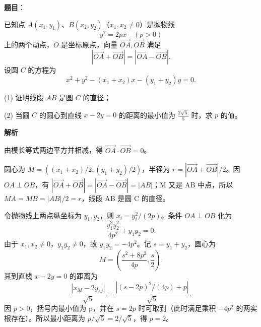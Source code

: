 \begin{answer}

\textbf{题目}：

已知点 \(A(x_1,y_1)\)、\(B(x_2,y_2)\)（\(x_1,x_2\ne0\)）是抛物线
\nopagebreak[4]
\[
y^2=2px\quad(p>0)
\]
上的两个动点，\(O\) 是坐标原点，向量 \(\overrightarrow{OA},\overrightarrow{OB}\) 满足
\nopagebreak[4]
\[
\left|\overrightarrow{OA}+\overrightarrow{OB}\right|=
\left|\overrightarrow{OA}-\overrightarrow{OB}\right|.
\]
设圆 \(C\) 的方程为
\nopagebreak[4]
\[
x^2+y^2-(x_1+x_2)x-(y_1+y_2)y=0.
\]

(1) 证明线段 \(AB\) 是圆 \(C\) 的直径；

(2) 当圆 \(C\) 的圆心到直线 \(x-2y=0\) 的距离的最小值为 \(\frac{2\sqrt5}{5}\) 时，求 \(p\) 的值。

\textbf{解析}

由模长等式两边平方并相减，得 $\overrightarrow{OA}\cdot\overrightarrow{OB}=0$。


圆心为 $M=((x_1+x_2)/2,(y_1+y_2)/2)$，半径为 $r=|\overrightarrow{OA}+\overrightarrow{OB}|/2$。因 $OA\perp OB$，有 $|\overrightarrow{OA}+\overrightarrow{OB}|=|\overrightarrow{OA}-\overrightarrow{OB}|=|AB|$；M 又是 AB 中点，所以 $MA=MB=|AB|/2=r$，线段 AB 是圆 C 的直径。


令抛物线上两点纵坐标为 $y_1,y_2$，则 $x_i=y_i^2/(2p)$。条件 $OA\perp OB$ 化为
\nopagebreak[4]
\[
\frac{y_1^2y_2^2}{4p^2}+y_1y_2=0.
\]
由于 $x_1,x_2\ne0$，$y_1y_2\ne0$，故 $y_1y_2=-4p^2$。记 $s=y_1+y_2$，圆心为
\nopagebreak[4]
\[
M=\left(\frac{s^2+8p^2}{4p},\frac{s}{2}\right).
\]
其到直线 $x-2y=0$ 的距离为
\nopagebreak[4]
\[
\frac{|x_M-2y_M|}{\sqrt5}
=\frac{|(s-2p)^2/(4p)+p|}{\sqrt5}.
\]
因 $p>0$，括号内最小值为 p，并在 $s=2p$ 时可取到（此时满足乘积 $-4p^2$ 的两实根存在）。所以最小距离为 $p/\sqrt5=2/\sqrt5$，得 $p=2$。



\end{answer}
